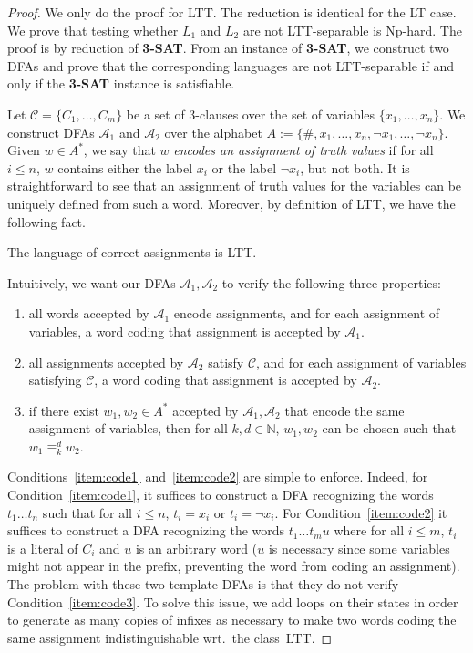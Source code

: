 \documentclass{LMCS}
\newcommand\nat{\ensuremath{\mathbb{N}}\xspace}
\newcommand\As{\ensuremath{\mathcal{A}}\xspace}
\newcommand\Cs{\ensuremath{\mathcal{C}}\xspace}
\newcommand{\lt}{\textup{LT}\xspace}
\newcommand{\ltt}{\textup{LTT}\xspace}
\newcommand\ltteq[2]{\ensuremath{\equiv_{#1}^{#2}}\xspace}
\newcommand\kdltteq{\ltteq{k}{d}}
\let\leq\leqslant
\theoremstyle{plain}
\begin{document}
\begin{proof}
  We only do the proof for \ltt. The reduction is identical for the
  \lt case.  We prove that testing whether $L_1$ and $L_2$ are
  not \ltt-separable is {\sc Np}-hard. The proof is by reduction of {\bf
    3-SAT}. From an instance of {\bf 3-SAT}, we construct two DFAs and
  prove that the corresponding languages are not \ltt-separable if and
  only if the {\bf
    3-SAT} instance is satisfiable.

  Let $\Cs=\{C_1,\dots,C_m\}$ be a set of $3$-clauses over the set of
  variables $\{x_1,\ldots,x_n\}$. We construct DFAs $\As_1$ and $\As_2$
  over the alphabet $A := \{ \#, x_1, \ldots ,x_n, \neg x_1, \ldots,
  \neg x_n\}$. Given $w \in A^*$, we say that $w$ \emph{encodes an
    assignment of truth values} if for all $i \leq n$, $w$ contains either
  the label $x_i$ or the label $\neg x_i$, but not both.
  It is straightforward to see that an assignment of truth values for the
  variables can be uniquely defined from such a word. Moreover, by
  definition of \ltt, we have the following fact.

  \begin{fact} \label{fct:assign}
    The language of correct assignments is \ltt.
  \end{fact}

  \noindent
  Intuitively, we want our DFAs $\As_1,\As_2$ to verify the following
  three properties:

  \begin{enumerate}
  \item\label{item:code1} all words accepted by $\As_1$ encode assignments, and for each
    assignment of variables, a word coding that assignment is
    accepted by $\As_1$.
  \item\label{item:code2} all assignments accepted by $\As_2$ satisfy \Cs, and for each
    assignment of variables satisfying \Cs, a word coding that
    assignment is accepted by $\As_2$.
  \item\label{item:code3} if there exist $w_1,w_2\in A^*$ accepted by
    $\As_1,\As_2$ that encode the same assignment of variables, then for
    all $k,d \in \nat$, $w_1,w_2$ can be chosen such that $w_1 \kdltteq
    w_2$.
  \end{enumerate}

\noindent Conditions~\eqref{item:code1} and~\eqref{item:code2} are simple to enforce. Indeed, for Condition~\eqref{item:code1}, it
  suffices to construct a DFA recognizing the words $t_1 \dots t_n$
  such that for all $i \leq n$, $t_i=x_i$ or $t_i= \neg x_i$. For
  Condition~\eqref{item:code2} it suffices to construct a DFA recognizing the words $t_1
  \dots t_mu$ where for all $i \leq m$, $t_i$ is a literal of $C_i$ and
  $u$ is an arbitrary word ($u$ is necessary since some variables might
  not appear in the prefix, preventing the word from coding an
  assignment). The problem with these two template DFAs is that they
  do not verify Condition~\eqref{item:code3}. To solve this issue, we add loops on their
  states in order to generate as many copies of infixes as necessary to
  make two words coding the same assignment indistinguishable wrt.~the class~\ltt.


\end{proof}
\end{document}
